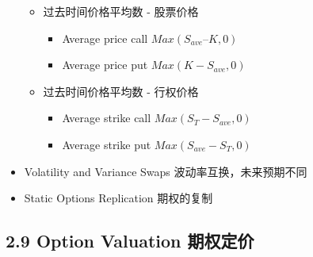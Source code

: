 \documentclass[a4paper,6pt,twoside,openany]{article}
\begin{document}
\begin{itemize}
\begin{itemize}
    \item 过去时间价格平均数 - 股票价格
      \begin{itemize}
      \item Average price call $Max(S_{ave} – K, 0)$
      \item Average price put $Max(K - S_{ave}, 0)$
      \end{itemize}
    \item 过去时间价格平均数 - 行权价格
      \begin{itemize}
      \item Average strike call $Max(S_T - S_{ave}, 0)$
      \item Average strike put $Max(S_{ave} - S_T, 0)$
      \end{itemize}
    \end{itemize}
  \item Volatility and Variance Swaps 波动率互换，未来预期不同
  \item Static Options Replication 期权的复制
\end{itemize}

\subsection*{2.9 Option Valuation 期权定价}
\end{document}
